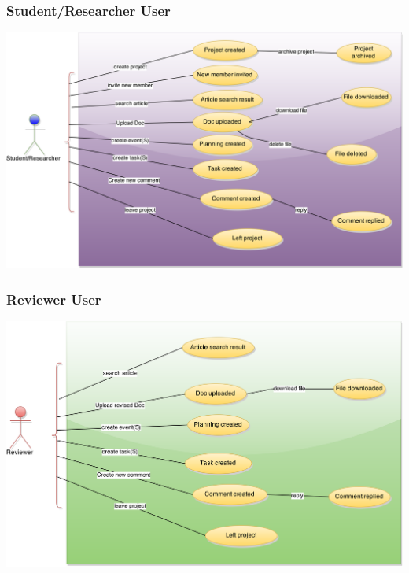 \subsubsection{Student/Researcher User} 

\begin{center}
\centering
\includegraphics[scale=0.3]{./img/dsgn_img/USECASE1.png}	
\end{center}


\subsubsection{Reviewer User} 
\begin{center}
\includegraphics[scale=0.3]{./img/dsgn_img/USECASE2.png}
	
\end{center}

